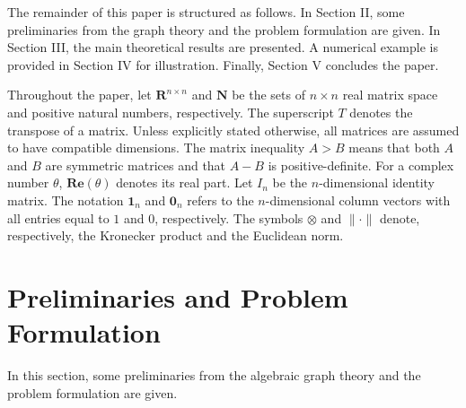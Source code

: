 \documentclass[letterpaper, 10 pt, conference]{ieeeconf}
\begin{document}
\par

The remainder of this paper is structured as follows. In
Section II, some preliminaries from the graph theory and
the problem formulation are given. In Section III, the main
theoretical results are presented. A numerical example is provided in Section
IV for illustration. Finally, Section V concludes the paper.

\par
Throughout the paper, let $\mathbf{R}^{n\times n}$ and $\mathbf{N}$ be the sets of $n\times n$ real
matrix space and positive natural numbers, respectively. The superscript
$T$ denotes the transpose of a
matrix. Unless explicitly stated otherwise,
  all matrices are assumed to have
compatible dimensions. The matrix inequality $A>B$ means that both $A$ and $B$
are symmetric matrices and that $A-B$ is positive-definite. For a complex
number $\theta$, $\mathbf{Re}(\theta)$
  denotes its real part.
Let $I_{n}$ be the $n$-dimensional identity matrix. The notation
$\mathbf{1}_n$ and $\mathbf{0}_{n}$ refers to the $n$-dimensional column
vectors with all entries equal to $1$ and $0$, respectively.
The symbols $\otimes$ and $\|\cdot\|$ denote, respectively, the Kronecker
product and the Euclidean norm.

\section{Preliminaries and Problem Formulation}

In this section, some preliminaries from the algebraic graph theory and the
problem formulation are given.
\end{document}
